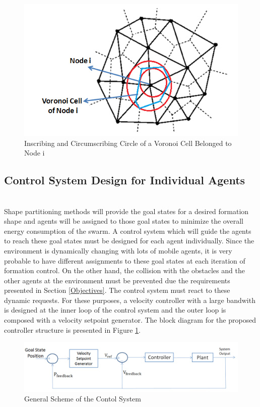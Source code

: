 \begin{figure}[H]
\caption{Inscribing and Circumscribing Circle of a Voronoi Cell Belonged to Node i}
\centering
\includegraphics[scale = 0.70]{voronoi2}
\end{figure}
	
\subsection{Control System Design for Individual Agents}\hspace{0pt} \\
Shape partitioning methods will provide the goal states for a desired formation shape and agents will be assigned to those goal states to minimize the overall energy consumption of the swarm. A control system which will guide the agents to reach these goal states must be designed for each agent individually. Since the environment is dynamically changing with lots of  mobile agents, it is very probable to have different assignments to these goal states at each iteration of formation control. On the other hand, the collision with the obstacles and the other agents at the environment must be prevented due the requirements presented in Section \ref{Objectives}. The control system must react to these dynamic requests. For these purposes, a velocity controller with a large bandwith is designed at the inner loop of the control system and the outer loop is composed with a velocity setpoint generator. The block diagram for the proposed controller structure is presented in Figure \ref{Controller_ref}.

\begin{figure}[H]
\caption{General Scheme of the Contol System} \label{Controller_ref}
\centering
\includegraphics[scale = 0.45]{controller}
\end{figure}

